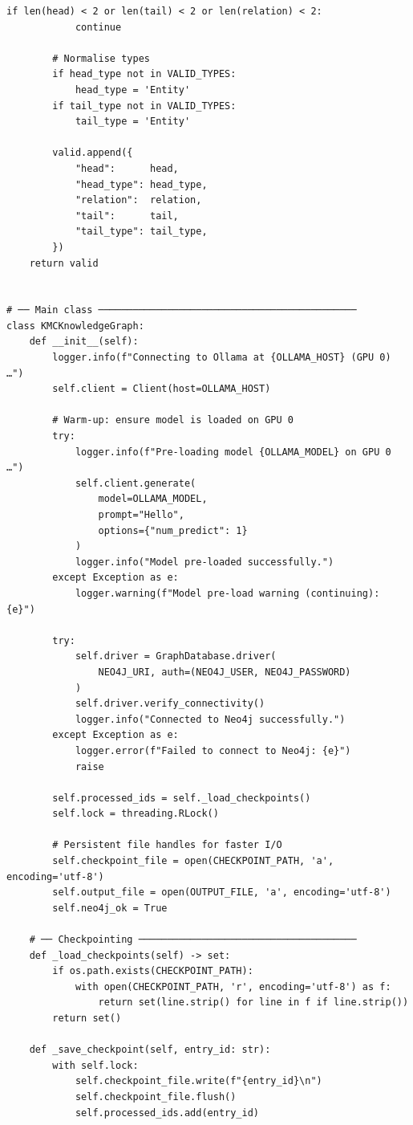 \documentclass[11pt]{article}
\begin{document}
\begin{lstlisting}[style=pythoncode, caption={kg\_generator\_gpu\_0.py}]
        if len(head) < 2 or len(tail) < 2 or len(relation) < 2:
            continue

        # Normalise types
        if head_type not in VALID_TYPES:
            head_type = 'Entity'
        if tail_type not in VALID_TYPES:
            tail_type = 'Entity'

        valid.append({
            "head":      head,
            "head_type": head_type,
            "relation":  relation,
            "tail":      tail,
            "tail_type": tail_type,
        })
    return valid


# ── Main class ─────────────────────────────────────────────
class KMCKnowledgeGraph:
    def __init__(self):
        logger.info(f"Connecting to Ollama at {OLLAMA_HOST} (GPU 0) …")
        self.client = Client(host=OLLAMA_HOST)

        # Warm-up: ensure model is loaded on GPU 0
        try:
            logger.info(f"Pre-loading model {OLLAMA_MODEL} on GPU 0 …")
            self.client.generate(
                model=OLLAMA_MODEL,
                prompt="Hello",
                options={"num_predict": 1}
            )
            logger.info("Model pre-loaded successfully.")
        except Exception as e:
            logger.warning(f"Model pre-load warning (continuing): {e}")

        try:
            self.driver = GraphDatabase.driver(
                NEO4J_URI, auth=(NEO4J_USER, NEO4J_PASSWORD)
            )
            self.driver.verify_connectivity()
            logger.info("Connected to Neo4j successfully.")
        except Exception as e:
            logger.error(f"Failed to connect to Neo4j: {e}")
            raise

        self.processed_ids = self._load_checkpoints()
        self.lock = threading.RLock()
        
        # Persistent file handles for faster I/O
        self.checkpoint_file = open(CHECKPOINT_PATH, 'a', encoding='utf-8')
        self.output_file = open(OUTPUT_FILE, 'a', encoding='utf-8')
        self.neo4j_ok = True

    # ── Checkpointing ──────────────────────────────────────
    def _load_checkpoints(self) -> set:
        if os.path.exists(CHECKPOINT_PATH):
            with open(CHECKPOINT_PATH, 'r', encoding='utf-8') as f:
                return set(line.strip() for line in f if line.strip())
        return set()

    def _save_checkpoint(self, entry_id: str):
        with self.lock:
            self.checkpoint_file.write(f"{entry_id}\n")
            self.checkpoint_file.flush()
            self.processed_ids.add(entry_id)


\end{lstlisting}
\end{document}

